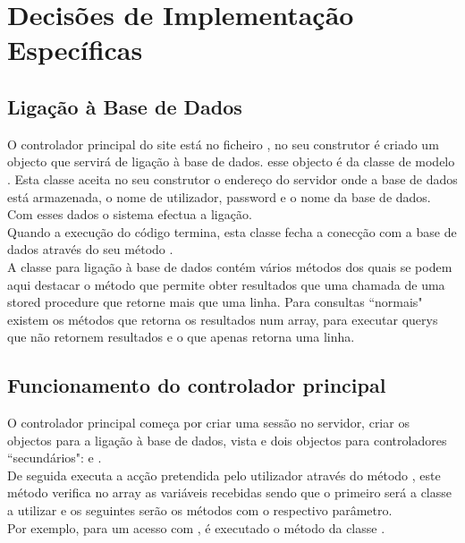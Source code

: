\section{Decisões de Implementação Específicas}
\subsection{Ligação à Base de Dados}
O controlador principal do site está no ficheiro , no seu construtor é criado um objecto que servirá de ligação à base de dados. esse objecto é da classe de modelo . Esta classe aceita no seu construtor o endereço do servidor onde a base de dados está armazenada, o nome de utilizador, password e o nome da base de dados. Com esses dados o sistema efectua a ligação.\\
Quando a execução do código termina, esta classe fecha a conecção com a base de dados através do seu método .\\
A classe para ligação à base de dados contém vários métodos dos quais se podem aqui destacar o método  que permite obter resultados que uma chamada de uma stored procedure que retorne mais que uma linha. Para consultas ``normais" existem os métodos  que retorna os resultados num array,  para executar querys que não retornem resultados e o  que apenas retorna uma linha.

\subsection{Funcionamento do controlador principal}
O controlador principal  começa por criar uma sessão  no servidor, criar os objectos para a ligação à base de dados, vista e dois objectos para controladores ``secundários":  e .\\
De seguida executa a acção pretendida pelo utilizador através do método , este método verifica no array  as variáveis recebidas sendo que o primeiro será a classe a utilizar e os seguintes serão os métodos com o respectivo parâmetro.\\
Por exemplo, para um acesso com , é executado o método  da classe .

